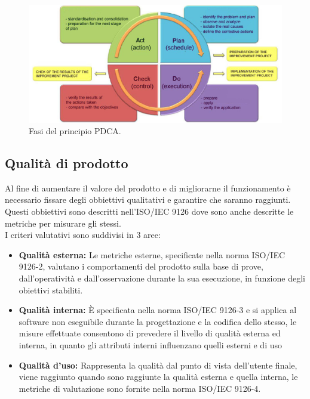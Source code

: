 \documentclass[a4paper]{report}
\begin{document}
				\begin{figure}[H]
					\centering
					\includegraphics[scale=0.4]{PDCA.jpg}
					\caption{Fasi del principio PDCA.}
				\end{figure}
			\subsection{Qualità di prodotto}
				Al fine di aumentare il valore del prodotto e di migliorarne il funzionamento è necessario fissare degli obbiettivi
				qualitativi e garantire che saranno raggiunti.\\
				Questi obbiettivi sono descritti nell'ISO/IEC 9126 dove sono anche descritte le metriche per misurare gli stessi.\\
				I criteri valutativi sono suddivisi in 3 aree:
				\begin{itemize}
					\item \textbf{Qualità esterna:} Le metriche esterne, specificate nella norma ISO/IEC 9126-2, valutano i
					comportamenti del prodotto sulla base di prove, dall'operatività e dall'osservazione durante la sua esecuzione,
					in funzione degli obiettivi stabiliti.
					\item \textbf{Qualità interna:} È specificata nella norma ISO/IEC 9126-3 e si applica al software non
					eseguibile durante la progettazione e la codifica dello stesso, le misure effettuate consentono di prevedere il
					livello di qualità esterna ed interna, in quanto gli attributi interni influenzano quelli esterni e di uso
					\item \textbf{Qualità d'uso:}  Rappresenta la qualità dal punto di vista dell'utente finale, viene raggiunto
					quando sono raggiunte la qualità esterna e quella interna, le metriche di valutazione sono fornite nella norma
					ISO/IEC 9126-4.
				\end{itemize}
				
\end{document}
